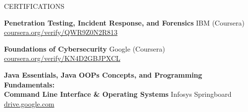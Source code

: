 \documentclass{resume} %
\begin{document}
\begin{rSection}{CERTIFICATIONS}

    \textbf{Penetration Testing, Incident Response, and Forensics} \hfill IBM (Coursera) \\
    \href{https://coursera.org/verify/QWR9Z0N2R813}{coursera.org/verify/QWR9Z0N2R813}

    \vspace{0.1em}
    \textbf{Foundations of Cybersecurity} \hfill Google (Coursera) \\
    \href{https://coursera.org/verify/KN4D2GBJPXCL}{coursera.org/verify/KN4D2GBJPXCL}

    \vspace{0.1em}
    \textbf{Java Essentials, Java OOPs Concepts, and Programming Fundamentals: \\Command Line Interface \& Operating Systems} \hfill Infosys Springboard \\
    \href{https://drive.google.com/drive/folders/1ku7JYTjOOhCaDRoSzWsCSC2EQIBROlZ5?usp=sharing}{drive.google.com}
    
\end{rSection}

\vspace{0.5em}
\end{document}
